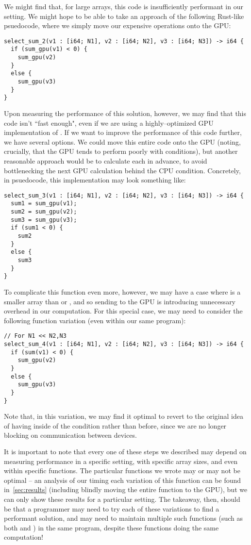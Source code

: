 We might find that, for large arrays, this code is insufficiently performant in our setting. We might hope to be able to take an approach of the following Rust-like psuedocode, where we simply move our expensive  operations onto the GPU:
%
\begin{lstlisting}
select_sum_2(v1 : [i64; N1], v2 : [i64; N2], v3 : [i64; N3]) -> i64 {
  if (sum_gpu(v1) < 0) {
    sum_gpu(v2)
  }
  else {
    sum_gpu(v3)
  }
}
\end{lstlisting}
%
Upon measuring the performance of this solution, however, we may find that this code isn't ``fast enough", even if we are using a highly--optimized GPU implementation of .  If we want to improve the performance of this code further, we have several options.  We could move this entire code onto the GPU (noting, crucially, that the GPU tends to perform poorly with conditions), but another reasonable approach would be to calculate each  in advance, to avoid bottlenecking the next GPU calculation behind the CPU condition.  Concretely, in psuedocode, this implementation may look something like:
%
\begin{lstlisting}
select_sum_3(v1 : [i64; N1], v2 : [i64; N2], v3 : [i64; N3]) -> i64 {
  sum1 = sum_gpu(v1);
  sum2 = sum_gpu(v2);
  sum3 = sum_gpu(v3);
  if (sum1 < 0) {
    sum2
  }
  else {
    sum3
  }
}
\end{lstlisting}
%
To complicate this function even more, however, we may have a case where  is a smaller array than  or , and so sending  to the GPU is introducing unnecessary overhead in our computation.  For this special case, we may need to consider the following function variation (even within our same program):
%
\begin{lstlisting}
// For N1 << N2,N3
select_sum_4(v1 : [i64; N1], v2 : [i64; N2], v3 : [i64; N3]) -> i64 {
  if (sum(v1) < 0) {
    sum_gpu(v2)
  }
  else {
    sum_gpu(v3)
  }
}
\end{lstlisting}
%
Note that, in this variation, we may find it optimal to revert to the original idea of having  inside of the condition rather than before, since we are no longer blocking on communication between devices.

It is important to note that every one of these steps we described may depend on measuring performance in a specific setting, with specific array sizes, and even within specific functions.  The particular functions we wrote may or may not be optimal -- an analysis of our timing each variation of this function can be found in~\ref{sec:results} (including blindly moving the entire  function to the GPU), but we can only show these results for a particular setting.  The takeaway, then, should be that a programmer may need to try each of these variations to find a performant solution, and may need to maintain multiple such functions (such as both  and ) in the same program, despite these functions doing the same computation!

